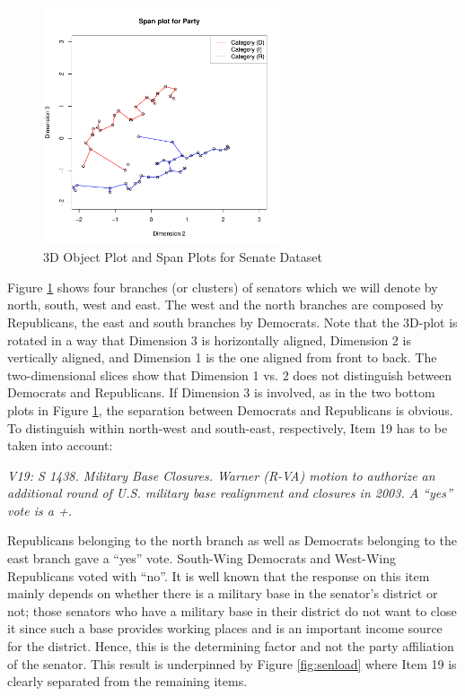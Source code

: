 \documentclass[article, nojss]{jss}
\begin{document}
\begin{figure}[ht]
\begin{center}
\includegraphics[height=70mm, width=70mm]{senatespan23.pdf}
\caption{\label{fig:sen} 3D Object Plot and Span Plots for Senate Dataset}
\end{center}
\end{figure}

Figure \ref{fig:sen} shows four branches (or clusters) of senators which we will denote by north, south, west and east. The west and the north branches are composed by Republicans, the east and south branches by Democrats. Note that the 3D-plot is rotated in a way that Dimension 3 is horizontally aligned, Dimension 2 is vertically aligned, and Dimension 1 is the one aligned from front to back. The two-dimensional slices show that Dimension 1 vs. 2 does not distinguish between Democrats and Republicans. If Dimension 3 is involved, as in the two bottom plots in Figure \ref{fig:sen}, the separation between Democrats and Republicans is obvious. To distinguish within north-west and south-east, respectively, Item 19 has to be taken into account:

\emph{V19: S 1438. Military Base Closures. Warner (R-VA) motion to authorize an additional round of U.S. military base realignment and closures in 2003. A ``yes'' vote is a +.} 

Republicans belonging to the north branch as well as Democrats belonging to the east branch gave a ``yes'' vote. South-Wing Democrats and West-Wing Republicans voted with ``no''. It is well known that the response on this item mainly depends on whether there is a military base in the senator's district or not; those senators who have a military base in their district do not want to close it since such a base provides working places and is an important income source for the district. Hence, this is the determining factor and not the party affiliation of the senator. This result is underpinned by Figure \ref{fig:senload} where Item 19 is clearly separated from the remaining items.
\end{document}

